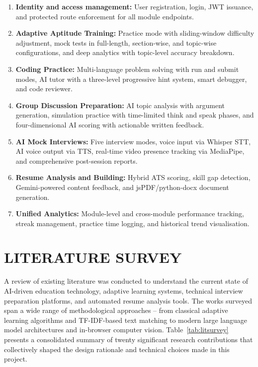 \documentclass[12pt,a4paper]{report}
\begin{document}
\begin{enumerate}[leftmargin=0.5in, label=\arabic*., topsep=4pt, itemsep=3pt]
    \item \textbf{Identity and access management:} User registration, login, JWT issuance, and protected route enforcement for all module endpoints.
    \item \textbf{Adaptive Aptitude Training:} Practice mode with sliding-window difficulty adjustment, mock tests in full-length, section-wise, and topic-wise configurations, and deep analytics with topic-level accuracy breakdown.
    \item \textbf{Coding Practice:} Multi-language problem solving with run and submit modes, AI tutor with a three-level progressive hint system, smart debugger, and code reviewer.
    \item \textbf{Group Discussion Preparation:} AI topic analysis with argument generation, simulation practice with time-limited think and speak phases, and four-dimensional AI scoring with actionable written feedback.
    \item \textbf{AI Mock Interviews:} Five interview modes, voice input via Whisper STT, AI voice output via TTS, real-time video presence tracking via MediaPipe, and comprehensive post-session reports.
    \item \textbf{Resume Analysis and Building:} Hybrid ATS scoring, skill gap detection, Gemini-powered content feedback, and jsPDF/python-docx document generation.
    \item \textbf{Unified Analytics:} Module-level and cross-module performance tracking, streak management, practice time logging, and historical trend visualisation.
\end{enumerate}

\chapter{LITERATURE SURVEY}

A review of existing literature was conducted to understand the current state of AI-driven education technology, adaptive learning systems, technical interview preparation platforms, and automated resume analysis tools. The works surveyed span a wide range of methodological approaches -- from classical adaptive learning algorithms and TF-IDF-based text matching to modern large language model architectures and in-browser computer vision. Table~\ref{tab:litsurvey} presents a consolidated summary of twenty significant research contributions that collectively shaped the design rationale and technical choices made in this project.
\end{document}

